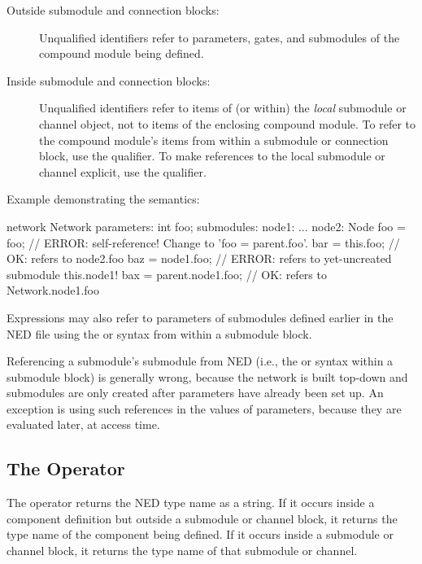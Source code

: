 \begin{description}
  \item[Outside submodule and connection blocks:] Unqualified identifiers refer
    to parameters, gates, and submodules of the compound module being defined.
  \item[Inside submodule and connection blocks:] Unqualified identifiers refer
    to items of (or within) the \textit{local} submodule or channel object, not
    to items of the enclosing compound module. To refer to the compound module's
    items from within a submodule or connection block, use the
     qualifier. To make references to the local submodule or
    channel explicit, use the  qualifier.
\end{description}

Example demonstrating the semantics:

\begin{ned}
network Network {
  parameters:
      int foo;
  submodules:
    node1: { ... }
    node2: Node {
      foo = foo; // ERROR: self-reference! Change to 'foo = parent.foo'.
      bar = this.foo;  // OK: refers to node2.foo
      baz = node1.foo;  // ERROR: refers to yet-uncreated submodule this.node1!
      bax = parent.node1.foo;  // OK: refers to Network.node1.foo
    }
}
\end{ned}

Expressions may also refer to parameters of submodules defined earlier in the
NED file using the  or
 syntax from within a submodule block.

\begin{note}
Referencing a submodule's submodule from NED (i.e., the  or
 syntax within a submodule block) is generally wrong, because the
network is built top-down and submodules are only created after parameters have
already been set up. An exception is using such references in the values of
 parameters, because they are evaluated later, at access time.
\end{note}



\subsection{The  Operator}
\label{sec:ned-ref:typename-operator}

The  operator returns the NED type name as a string. If it
occurs inside a component definition but outside a submodule or channel block,
it returns the type name of the component being defined. If it occurs inside a
submodule or channel block, it returns the type name of that submodule or
channel.

